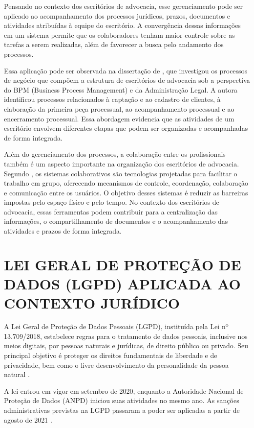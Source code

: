 Pensando no contexto dos escritórios de advocacia, esse gerenciamento pode ser aplicado ao acompanhamento dos processos jurídicos, prazos, documentos e atividades atribuídas à equipe do escritório. A convergência dessas informações em um sistema permite que os colaboradores tenham maior controle sobre as tarefas a serem realizadas, além de favorecer a busca pelo andamento dos processos.

Essa aplicação pode ser observada na dissertação de , que investigou os processos de negócio que compõem a estrutura de escritórios de advocacia sob a perspectiva do BPM (Business Process Management) e da Administração Legal. A autora identificou processos relacionados à captação e ao cadastro de clientes, à elaboração da primeira peça processual, ao acompanhamento processual e ao encerramento processual. Essa abordagem evidencia que as atividades de um escritório envolvem diferentes etapas que podem ser organizadas e acompanhadas de forma integrada.

Além do gerenciamento dos processos, a colaboração entre os profissionais também é um aspecto importante na organização dos escritórios de advocacia. Segundo , os sistemas colaborativos são tecnologias projetadas para facilitar o trabalho em grupo, oferecendo mecanismos de controle, coordenação, colaboração e comunicação entre os usuários. O objetivo desses sistemas é reduzir as barreiras impostas pelo espaço físico e pelo tempo. No contexto dos escritórios de advocacia, essas ferramentas podem contribuir para a centralização das informações, o compartilhamento de documentos e o acompanhamento das atividades e prazos de forma integrada.

\section{LEI GERAL DE PROTEÇÃO DE DADOS (LGPD) APLICADA AO CONTEXTO JURÍDICO}

A Lei Geral de Proteção de Dados Pessoais (LGPD), instituída pela Lei nº 13.709/2018, estabelece regras para o tratamento de dados pessoais, inclusive nos meios digitais, por pessoas naturais e jurídicas, de direito público ou privado. Seu principal objetivo é proteger os direitos fundamentais de liberdade e de privacidade, bem como o livre desenvolvimento da personalidade da pessoa natural \cite{brasil2018lgpd}.

A lei entrou em vigor em setembro de 2020, enquanto a Autoridade Nacional de Proteção de Dados (ANPD) iniciou suas atividades no mesmo ano. As sanções administrativas previstas na LGPD passaram a poder ser aplicadas a partir de agosto de 2021 \cite{anpd2026}.

